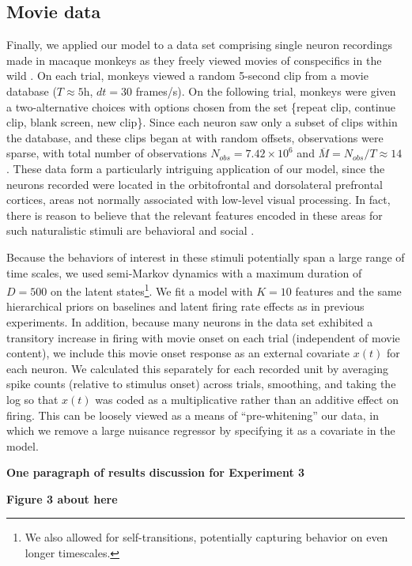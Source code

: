 \documentclass{article} %
\begin{document}
\subsection{Movie data}
Finally, we applied our model to a data set comprising single neuron recordings made in macaque monkeys as they freely viewed movies of conspecifics in the wild %
. On each trial, monkeys viewed a random 5-second clip from a movie database ($T \approx 5$h, $dt = 30$ frames/s). On the following trial, monkeys were given a two-alternative choices with options chosen from the set \{repeat clip, continue clip, blank screen, new clip\}. Since each neuron saw only a subset of clips within the database, and these clips began at with random offsets, observations were sparse, with total number of observations $N_{obs} = 7.42 \times 10^6$ and $\overline{M} = N_{obs}/T \approx 14$. These data form a particularly intriguing application of our model, since the neurons recorded were located in the orbitofrontal and dorsolateral prefrontal cortices, areas not normally associated with low-level visual processing. In fact, there is reason to believe that the relevant features encoded in these areas for such naturalistic stimuli are behavioral and social \cite{watson2012social}.

Because the behaviors of interest in these stimuli potentially span a large range of time scales, we used semi-Markov dynamics with a maximum duration of $D = 500$ on the latent states\footnote{We also allowed for self-transitions, potentially capturing behavior on even longer timescales.}. We fit a model with $K=10$ features and the same hierarchical priors on baselines and latent firing rate effects as in previous experiments. In addition, because many neurons in the data set exhibited a transitory increase in firing with movie onset on each trial (independent of movie content), we include this movie onset response as an external covariate $x(t)$ for each neuron. We calculated this separately for each recorded unit by averaging spike counts (relative to stimulus onset) across trials, smoothing, and taking the log so that $x(t)$ was coded as a multiplicative rather than an additive effect on firing. This can be loosely viewed as a means of ``pre-whitening'' our data, in which we remove a large nuisance regressor by specifying it as a covariate in the model.

\textbf{One paragraph of results discussion for Experiment 3}

\textbf{Figure 3 about here}
\end{document}
